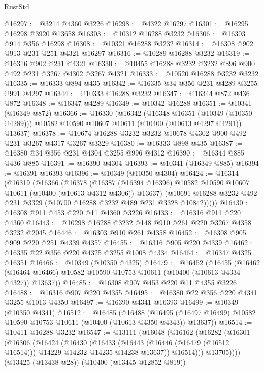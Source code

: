 \begin{lexlean}{RustStd}
\begin{coremodule}
@16297 := @3214 @4360 @3226
@16298 := @4322 @16297
@16301 := @16295 @16298 @3920 @13658
@16303 := @10312 @16288 @3232
@16306 := @16303 @914 @356 @16298
@16308 := @10321 @16288 @3232
@16314 := @16308 @902 @913 @231 @251 @4321 @16297
@16316 := @10289 @16288 @3232
@16319 := @16316 @902 @231 @4321
@16330 := @10455 @16288 @3232 @3232 @896 @900 @492 @231 @3267 @4302 @3267 @4321
@16333 := @10520 @16288 @3232 @3232
@16335 := @16333 @894 @435
@16342 := @16335 @34 @356 @231 @4289 @3255 @991 @4297
@16344 := @10333 @16288 @3232
@16347 := @16344 @872 @436 @872
@16348 := @16347 @4289
@16349 := @10342 @16288
@16351 := @10341 (@16349 @872)
@16366 := @16330
    (@16342
      (@16348 @16351 (@10349 (@10350 @4289)))
      @10582
      @10590
      @10607
      @10611
      (@10400 (@10613 @4297 @4291))
      @13637)
@16378 := @10674 @16288 @3232 @3232 @10678 @4302 @900 @492 @231 @3267 @4317 @3267 @3329
@16380 := @16333 @898 @435
@16387 := @16380 @34 @356 @231 @4304 @3255 @996 @4312
@16390 := @16344 @885 @436 @885
@16391 := @16390 @4304
@16393 := @10341 (@16349 @885)
@16394 := @16391 @16393
@16396 := @10349 (@10350 @4304)
@16424 := @16314
    (@16319
      (@16366
        (@16378
          (@16387 (@16394 @16396) @10582 @10590 @10607 @10611 (@10400 (@10613 @4312 @4306)) @13637)
          (@10691 @16288 @3232 @492 @231 @3329 (@10700 @16288 @3232 @489 @231 @3328 @10842)))))
@16430 := @16308 @911 @453 @220 @11 @4360 @3226
@16433 := @16316 @911 @220 @4360
@16443 := @10298 @16288 @3232 @148 @910 @261 @220 @3267 @4358 @3232 @2045
@16446 := @16303 @910 @261 @4358
@16452 := @16308 @905 @909 @220 @251 @4339 @4357
@16455 := @16316 @905 @220 @4339
@16462 := @16335 @22 @356 @220 @4325 @3255 @1008 @4334
@16464 := @16347 @4325 @16351
@16466 := @10349 (@10350 @4325)
@16479 := @16452
    (@16455
      (@16462 (@16464 @16466) @10582 @10590 @10753 @10611 (@10400 (@10613 @4334 @4327)) @13637))
@16485 := @16308 @907 @453 @220 @11 @4355 @3226
@16488 := @16316 @907 @220 @4355
@16495 := @16380 @22 @356 @220 @4341 @3255 @1013 @4350
@16497 := @16390 @4341 @16393
@16499 := @10349 (@10350 @4341)
@16512 := @16485
    (@16488
      (@16495 (@16497 @16499) @10582 @10590 @10753 @10611 (@10400 (@10613 @4350 @4343)) @13637))
@16514 := @10411 @16288 @3232
@16547 := @13111
    (@16048
      (@16162
        (@16282
          (@16301
            (@16306
              (@16424
                (@16430
                  (@16433
                    (@16443 (@16446 (@16479 (@16512 @16514))) @14229 @14232 @14235 @14238 @13637))
                  @16514)))
            @13705))))
    (@13425 (@13438 @28))
    (@10400 (@13445 @12852 @819))

\end{coremodule}
\end{lexlean}
